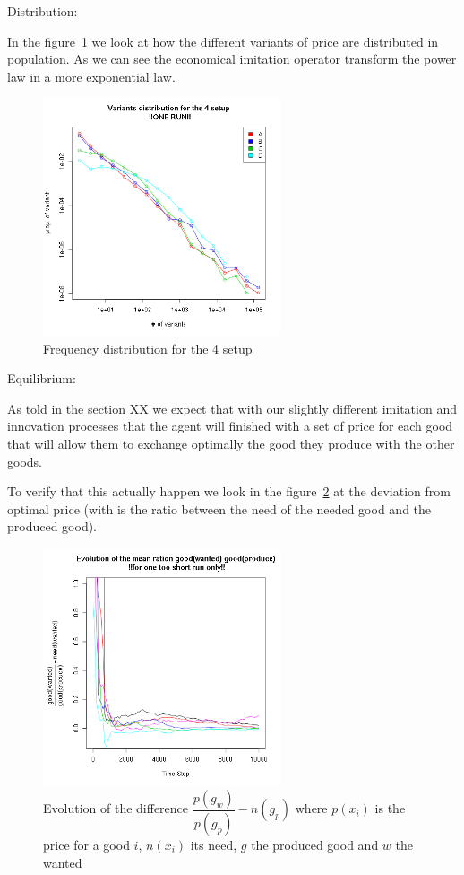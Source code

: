 \documentclass{wscpaperproc}
\begin{document}
Distribution:

In the figure~\ref{fig:4setDi} we look at how the different variants of price are distributed in population. As we can see the economical imitation operator transform the power law in a more exponential law.
\begin{figure}[htpb]
	\begin{center}
		\includegraphics[width=7cm]{img/4SetupDistrib.png}
	\end{center}
	\caption{Frequency distribution for the 4 setup}
	\label{fig:4setDi}
\end{figure}


Equilibrium:

As told in the section XX we expect that with our slightly different imitation and innovation processes that the agent will finished with a set of price for each good that will allow them to exchange optimally the good they produce with the other goods.


To verify that this actually happen we look in the figure~\ref{fig:ratioEvol} at the deviation from optimal price (with is the ratio between the need of the needed good and the produced good).
\begin{figure}[htp]
	\begin{center}
		\includegraphics[width=7cm]{img/ratioEvol.png}
	\end{center}
	\caption{Evolution of the difference $\dfrac{p(g_w)}{p(g_p)}-n(g_p)$ where $p(x_i)$ is the price for a good $i$, $n(x_i)$ its need, $g$ the produced good and $w$ the wanted}
	\label{fig:ratioEvol}
\end{figure}
\end{document}
